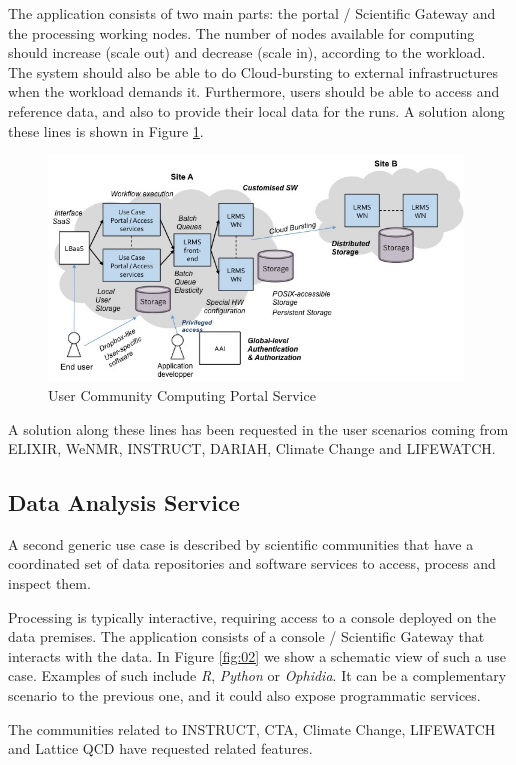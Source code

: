 \documentclass{article}
\begin{document}
The application consists of two main parts: the portal / Scientific Gateway and the processing working nodes. The number of nodes available for computing should increase (scale out) and decrease (scale in), according to the workload. The system should also be able to do Cloud-bursting to external infrastructures when the workload demands it. Furthermore, users should be able to access and reference data, and also to provide their local data for the runs. A solution along these lines is shown in Figure \ref{fig:01}.

\begin{figure}
  \centering
  \includegraphics[width=11cm]{./figs/Figure01.jpg}
  \caption{User Community Computing Portal Service}
  \label{fig:01}
\end{figure}

A solution along these lines has been requested in the user scenarios coming from ELIXIR, WeNMR, INSTRUCT, DARIAH, Climate Change and LIFEWATCH.

\subsection{Data Analysis Service}

A second generic use case is described by scientific communities that have a coordinated set of data repositories and software services to access, process and inspect them. 

Processing is typically interactive, requiring access to a console deployed on the data premises. The application consists of a console / Scientific Gateway that interacts with the data. In Figure \ref{fig:02} we show a schematic view of such a use case. Examples of such include {\sl R}, {\sl Python} or {\sl Ophidia}. It can be a complementary scenario to the previous one, and it could also expose programmatic services.

The communities related to INSTRUCT, CTA, Climate Change, LIFEWATCH and Lattice QCD have requested related features.
\end{document}
